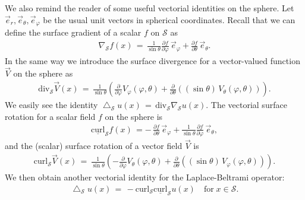 \documentclass[final]{siamltex}
\newcommand{\lap}{\bigtriangleup}
\renewcommand{\S} {\mathcal{S}}
\begin{document}
We also remind the reader of some useful vectorial
identities on the sphere. Let $\vec{e}_r, \vec{e}_\theta,
\vec{e}_{\varphi} $ be the usual unit vectors in spherical coordinates.
Recall that we can define the surface gradient of a scalar $f$ on $\S$
as
\begin{align*}
\nabla_{\S} f(x) \,  = \, \frac{1}{\sin \theta}\frac{\partial f}{\partial \varphi}
\,\vec{e}_{\varphi} + \frac{\partial f}{\partial \theta}\, \vec{e}_{\theta}.
\end{align*}
In the same way we introduce the surface divergence for a vector-valued
function $\vec{V}$ on the sphere as
\begin{align*}
\mbox{div}_{\S} \vec{V}(x) \, = \, 
\frac{1}{\sin \theta} \left(
\frac{\partial}{\partial \varphi}
V_{\varphi}(\varphi,\theta) +
\frac{\partial}{\partial \theta} ((\sin\theta) \, V_{\theta}(\varphi,\theta) )
\right).
\end{align*}
We easily see the identity $\lap_{\S}u(x) \, = \,
\mbox{div}_{\S}\nabla_{\S} u(x)$.  The vectorial surface rotation for a
scalar field $f$ on the sphere is 
\begin{align*}
\underline{\mbox{curl}}_{\S} f(x) \, = -\, \frac{\partial
f}{\partial \theta} \,\vec{e}_{\varphi} + \frac{1}{\sin
\theta}\frac{\partial f}{\partial \varphi}\, \vec{e}_{\theta},
\end{align*}
and the (scalar) surface rotation of a vector field $\vec{V}$ is
\begin{align*}
\mbox{curl}_{\S} \vec{V}(x) \, = \,
\frac{1}{\sin \theta} \left(
- \frac{\partial}{\partial \varphi} V_{\theta}(\varphi,\theta) +
\frac{\partial}{\partial \theta} ((\sin \theta) \, V_{\varphi}(\varphi,\theta))  
\right).
\end{align*}
We then obtain another vectorial identity for the Laplace-Beltrami
operator:
\begin{align*}
\lap_{\S} u(x) \, = \, 
- \mbox{curl}_{\S} \underline{\mbox{curl}}_{\S} u(x) 
\quad \mbox{for} \; x \in {\S}.
\end{align*}
\end{document}
